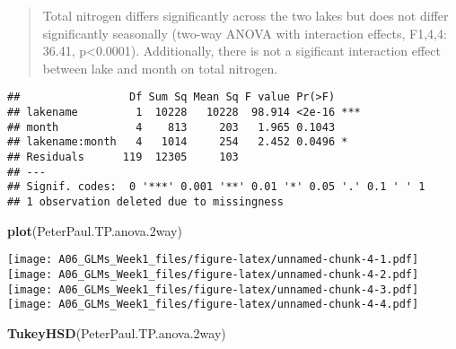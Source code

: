 \documentclass[]{article}
\newenvironment{Shaded}{\begin{snugshade}}{\end{snugshade}}
\newcommand{\CommentTok}[1]{\textcolor[rgb]{0.56,0.35,0.01}{\textit{#1}}}
\newcommand{\DataTypeTok}[1]{\textcolor[rgb]{0.13,0.29,0.53}{#1}}
\newcommand{\FloatTok}[1]{\textcolor[rgb]{0.00,0.00,0.81}{#1}}
\newcommand{\KeywordTok}[1]{\textcolor[rgb]{0.13,0.29,0.53}{\textbf{#1}}}
\newcommand{\NormalTok}[1]{#1}
\newcommand{\OperatorTok}[1]{\textcolor[rgb]{0.81,0.36,0.00}{\textbf{#1}}}
\newcommand{\StringTok}[1]{\textcolor[rgb]{0.31,0.60,0.02}{#1}}
\begin{document}
\begin{quote}
Total nitrogen differs significantly across the two lakes but does not
differ significantly seasonally (two-way ANOVA with interaction effects,
F1,4,4: 36.41, p\textless{}0.0001). Additionally, there is not a
sigificant interaction effect between lake and month on total nitrogen.
\end{quote}

\begin{Shaded}
\end{Shaded}

\begin{verbatim}
##                 Df Sum Sq Mean Sq F value Pr(>F)    
## lakename         1  10228   10228  98.914 <2e-16 ***
## month            4    813     203   1.965 0.1043    
## lakename:month   4   1014     254   2.452 0.0496 *  
## Residuals      119  12305     103                   
## ---
## Signif. codes:  0 '***' 0.001 '**' 0.01 '*' 0.05 '.' 0.1 ' ' 1
## 1 observation deleted due to missingness
\end{verbatim}

\begin{Shaded}
\begin{Highlighting}[]
\KeywordTok{plot}\NormalTok{(PeterPaul.TP.anova}\FloatTok{.2}\NormalTok{way)}
\end{Highlighting}
\end{Shaded}

\texttt{[image: A06\_GLMs\_Week1\_files/figure-latex/unnamed-chunk-4-1.pdf]}
\texttt{[image: A06\_GLMs\_Week1\_files/figure-latex/unnamed-chunk-4-2.pdf]}
\texttt{[image: A06\_GLMs\_Week1\_files/figure-latex/unnamed-chunk-4-3.pdf]}
\texttt{[image: A06\_GLMs\_Week1\_files/figure-latex/unnamed-chunk-4-4.pdf]}

\begin{Shaded}
\begin{Highlighting}[]
\KeywordTok{TukeyHSD}\NormalTok{(PeterPaul.TP.anova}\FloatTok{.2}\NormalTok{way)}
\end{Highlighting}
\end{Shaded}
\end{document}
